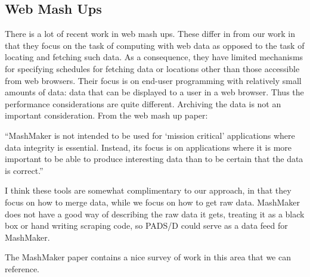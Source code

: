 \subsection{Web Mash Ups}
There is a lot of recent work in web mash
ups\cite{ennals+:mashmaker,yahoopipes,swivel.com}.  These differ in
from our work in that they focus on the task of computing with web
data as opposed to the task of locating and fetching such data. As a
consequence, they have limited mechanisms for specifying schedules for
fetching data or locations other than those accessible from web
browsers.  Their focus is on end-user programming with relatively
small amounts of data: data that can be displayed to a user in a web
browser.  Thus the performance considerations are quite different.
Archiving the data is not an important consideration.  From the web
mash up paper:

``MashMaker is not intended to be used for `mission critical'
applications where data integrity is essential.  Instead, its focus is
on applications where it is more important to be able to produce
interesting data than to be certain that the data is correct.''

I think these tools are somewhat complimentary to our approach, in
that they focus on how to merge data, while we focus on how to get raw
data.  MashMaker does not have a good way of describing the raw data
it gets, treating it as a black box or hand writing scraping code, so
PADS/D could serve as a data feed for MashMaker.

The MashMaker paper contains a nice survey of work in this area that
we can reference.
